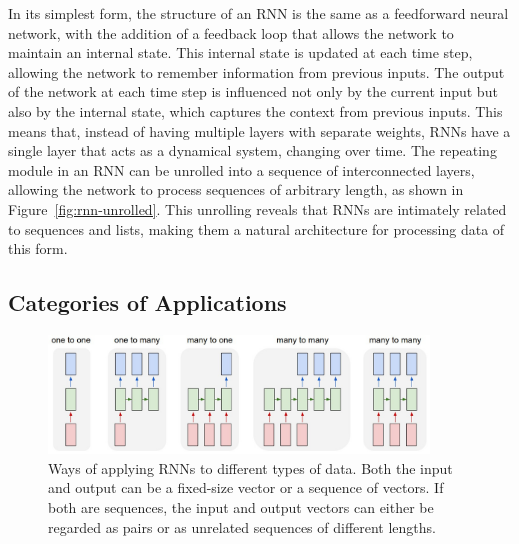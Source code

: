 \documentclass{article}
\newcommand{\reffig}[1]{Figure~\ref{#1}}
\begin{document}
In its simplest form, the structure of an RNN is the same as a feedforward neural network,
with the addition of a feedback loop that allows the network to maintain an internal
state. This internal state is updated at each time step, allowing the network to remember
information from previous inputs. The output of the network at each time step is
influenced not only by the current input but also by the internal state, which captures
the context from previous inputs. This means that, instead of having multiple layers with
separate weights, RNNs have a single layer that acts as a dynamical system, changing over
time. The repeating module in an RNN can be unrolled into a sequence of interconnected
layers, allowing the network to process sequences of arbitrary length, as shown in
\reffig{fig:rnn-unrolled}. This unrolling reveals that RNNs are intimately related to
sequences and lists, making them a natural architecture for processing data of this form.

\subsection{Categories of Applications}
\label{sec:2.0}

\begin{figure}[htbp]
  \centering
  \includegraphics[width=0.9\textwidth]{Karpathy application types.jpeg}
  \caption{Ways of applying RNNs to different types of data. Both the input and output can
    be a fixed-size vector or a sequence of vectors. If both are sequences, the input and
    output vectors can either be regarded as pairs or as unrelated sequences of different
    lengths. \cite{karpathyUnreasonableEffectivenessRecurrent}}
  \label{fig:rnn-application-types}
\end{figure}
\end{document}
